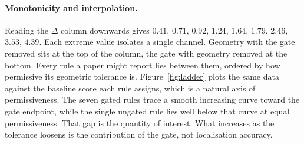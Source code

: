 \documentclass[runningheads,a4paper]{llncs}
\begin{document}
\paragraph{Monotonicity and interpolation.}
Reading the $\Delta$ column downwards gives $0.41$, $0.71$, $0.92$, $1.24$, $1.64$, $1.79$,
$2.46$, $3.53$, $4.39$. Each extreme value isolates a single channel. Geometry with
the gate removed sits at the top of the column, the gate with geometry removed at the bottom. Every
rule a paper might report lies between them, ordered by how permissive its geometric
tolerance is.
Figure~\ref{fig:ladder} plots the same data against the baseline score each rule
assigns, which is a natural axis of permissiveness. The seven gated rules trace a smooth
increasing curve toward the gate endpoint, while the single ungated rule lies well below that
curve at equal permissiveness. That gap is the quantity of interest. What
increases as the tolerance loosens is the contribution of the gate, not localisation accuracy.
\end{document}
